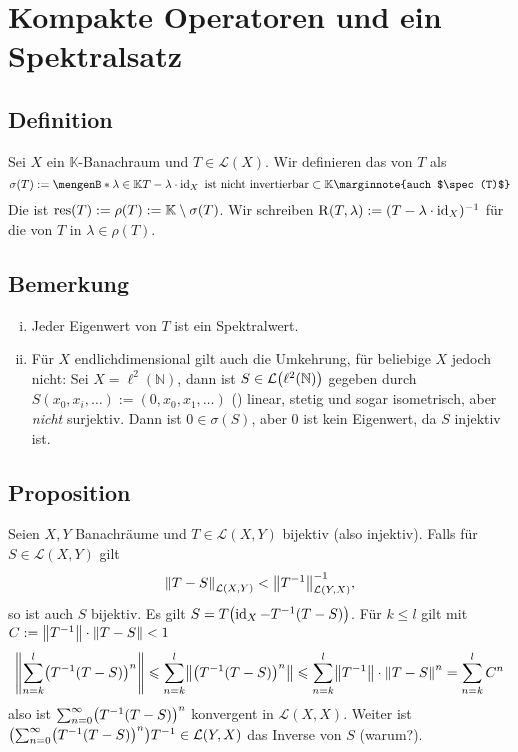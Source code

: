 \section{Kompakte Operatoren und ein Spektralsatz} %
\label{sec:8}

\subsection[Definition: Spektrum eines Bachnachraumes]{Definition} %
\label{sub:81}
Sei $X$ ein $\mathds{K}$-Banachraum und $T \in \mathcal{L}(X)$. Wir definieren das  von $T$ als 
\[
	\sigma(T) := \set[\lambda \in \mathds{K}]{T- \lambda \cdot \id_X \text{ ist nicht invertierbar}} \subset \mathds{K} \marginnote{auch $\spec(T)$} 
\]
Die  ist $\res(T) :=  \rho(T) := \mathds{K} \setminus \sigma(T)$. Wir schreiben $\resolv(T,\lambda) := (T- \lambda \cdot \id_X) ^{-1}$ für
die  von $T$ in $\lambda \in \rho(T)$. 

\subsection[Bemerkung zum Zusammenhang von Spektralwerten und Eigenwerten]{Bemerkung} %
\label{sub:82}
\begin{enumerate}[(i)]
	\item Jeder Eigenwert von $T$ ist ein Spektralwert.
	\item Für $X$ endlichdimensional gilt auch die Umkehrung, für beliebige $X$ jedoch nicht: Sei $X=\ell^2(\mathds{N})$, dann ist $S \in \mathcal{L}\enbrace[\big]{\ell^2(\mathds{N})}$
	gegeben durch $S(x_0, x_i, \ldots) := (0,x_0, x_1, \ldots)$ () linear, stetig und sogar isometrisch, aber \emph{nicht} surjektiv. Dann ist
	$0 \in \sigma(S)$, aber $0$ ist kein Eigenwert, da $S$ injektiv ist.
\end{enumerate}

\subsection{Proposition} %
\label{sub:83}
Seien $X,Y$ Banachräume und $T \in \mathcal{L}(X,Y)$ bijektiv (also injektiv). Falls für $S \in \mathcal{L}(X,Y)$ gilt 
\[
	\norm[\mathcal{L}(X,Y)]{T-S} < \norm[\mathcal{L}(Y,X)]{T^{-1}}^{-1}, 
\]
so ist auch $S$ bijektiv.
Es gilt $S= T \enbrace[\big]{\id_X - T ^{-1}(T-S)}$. Für $k \le l$ gilt mit $C := \norm{T ^{-1}} \cdot \norm{T-S} < 1$ 
\begin{align*}
	\norm{\sum_{n=k}^{l} \enbrace[\big]{T^{-1}(T-S)}^n } \le \sum_{n=k}^{l} \norm{\enbrace[\big]{T ^{-1}(T-S)}^n} \le \sum_{n=k}^{l} \norm{T ^{-1}} \cdot \norm{T-S}^n
	= \sum_{n=k}^{l} C^n      
\end{align*}
also ist $\sum_{n=0}^{\infty} \enbrace[\big]{T ^{-1}(T-S)}^n$ konvergent in $\mathcal{L}(X,X)$. Weiter ist 
$\enbrace*{\sum_{n=0}^{\infty} \enbrace[\big]{T ^{-1}(T-S)}^n} T ^{-1} \in \mathcal{L}(Y,X)$ das Inverse von $S$ (warum?). \bewende

